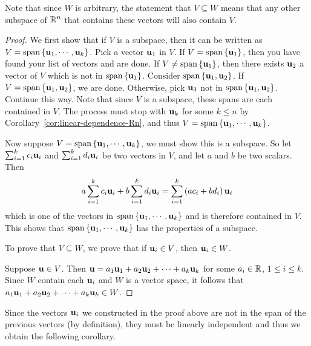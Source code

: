 Note that since $W$ is arbitrary, the statement that $V \subseteq W$
means that any other subspace of $\mathbb{R}^n$ that contains these vectors
will also contain $V$.

\begin{proof}
  We first show that if $V$ is a subspace, then it can be written as
  $V= \sspan\set{\vect{u}_{1},\cdots ,\vect{u}_{k}}$. Pick a vector
  $\mbox{\bf u}_{1}$ in $V$. If $V= \sspan\set{\vect{u}_{1}}$, then you
  have found your list of vectors and are done. If
  $V\neq \sspan\set{\vect{u}_{1}}$, then there exists $\mbox{\bf u}_{2}$ a
  vector of $V$ which is not in $ \sspan\set{\vect{u}_{1}}$. Consider
  $\sspan\set{ \vect{u}_{1},\vect{u}_{2}}$.  If
  $V=\sspan\set{\vect{u}_{1},\vect{u}_{2}}$, we are done. Otherwise,
  pick $\mbox{\bf u}_{3}$ not in
  $\sspan\set{\vect{u}_{1},\vect{u}_{2}}$. Continue this way.  Note
  that since $V $ is a subspace, these spans are each contained in
  $V$.  The process must stop with $\mbox{\bf u}_{k}$ for some $k\leq n$
  by Corollary~\ref{cor:linear-dependence-Rn}, and thus
  $V=\sspan\set{\vect{u}_{1},\cdots , \vect{u}_{k}}$.

  Now suppose $V=\sspan\set{\vect{u}_{1},\cdots , \vect{u}_{k}}$, we
  must show this is a subspace. So let
  $\sum_{i=1}^{k}c_{i}\mbox{\bf u}_{i}$ and
  $ \sum_{i=1}^{k}d_{i}\mbox{\bf u}_{i}$ be two vectors in $V$, and let
  $a$ and $b$ be two scalars. Then
  \begin{equation*}
    a \sum_{i=1}^{k}c_{i}\mbox{\bf u}_{i}+ b \sum_{i=1}^{k}d_{i}\mbox{\bf u}_{i}=
    \sum_{i=1}^{k}\left(a c_{i}+b  d_{i}\right) \mbox{\bf u}_{i}
  \end{equation*}
  which is one of the vectors in
  $\sspan\set{\vect{u}_{1},\cdots , \vect{u}_{k}}$ and is therefore
  contained in $V$. This shows that
  $\sspan\set{\vect{u}_{1},\cdots ,\vect{u}_{k}} $ has the properties
  of a subspace.

  To prove that $V \subseteq W$, we prove that if $\mbox{\bf u}_i\in V$,
  then $\mbox{\bf u}_i \in W$.

  Suppose $\mbox{\bf u}\in V$.  Then
  $\mbox{\bf u}=a_1\mbox{\bf u}_1 + a_2\mbox{\bf u}_2 + \cdots + a_k\mbox{\bf u}_k$
  for some $a_i\in\mathbb{R}$, $1\leq i\leq k$.  Since $W$ contain each
  $\mbox{\bf u}_i$ and $W$ is a vector space, it follows that
  $ a_1\mbox{\bf u}_1 + a_2\mbox{\bf u}_2 + \cdots + a_k\mbox{\bf u}_k \in W$.
\end{proof}

Since the vectors $\mbox{\bf u}_i$ we constructed in the proof above are
not in the span of the previous vectors (by definition), they must be
linearly independent and thus we obtain the following corollary.

